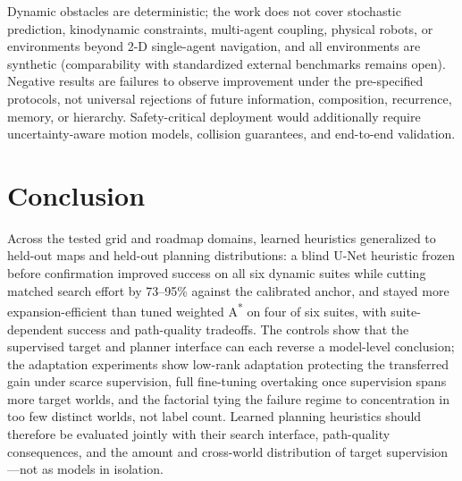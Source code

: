 \documentclass[letterpaper]{article} %
\begin{document}
Dynamic obstacles are deterministic; the work does not cover stochastic prediction, kinodynamic constraints, multi-agent coupling, physical robots, or environments beyond 2-D single-agent navigation, and all environments are synthetic (comparability with standardized external benchmarks remains open). Negative results are failures to observe improvement under the pre-specified protocols, not universal rejections of future information, composition, recurrence, memory, or hierarchy. Safety-critical deployment would additionally require uncertainty-aware motion models, collision guarantees, and end-to-end validation.

\section{Conclusion}

Across the tested grid and roadmap domains, learned heuristics generalized to held-out maps and held-out planning distributions: a blind U-Net heuristic frozen before confirmation improved success on all six dynamic suites while cutting matched search effort by 73--95\% against the calibrated anchor, and stayed more expansion-efficient than tuned weighted A\textsuperscript{*} on four of six suites, with suite-dependent success and path-quality tradeoffs. The controls show that the supervised target and planner interface can each reverse a model-level conclusion; the adaptation experiments show low-rank adaptation protecting the transferred gain under scarce supervision, full fine-tuning overtaking once supervision spans more target worlds, and the factorial tying the failure regime to concentration in too few distinct worlds, not label count. Learned planning heuristics should therefore be evaluated jointly with their search interface, path-quality consequences, and the amount and cross-world distribution of target supervision---not as models in isolation.



\end{document}
